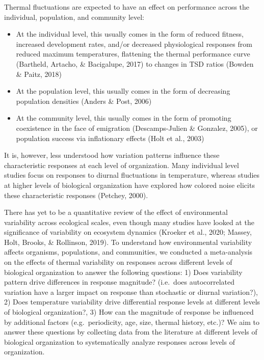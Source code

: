 \documentclass[12pt,twoside]{reedthesis}
\begin{document}
Thermal fluctuations are expected to have an effect on performance across the individual, population, and community level:
\begin{itemize}
\item
  At the individual level, this usually comes in the form of reduced fitness, increased development rates, and/or decreased physiological responses from reduced maximum temperatures, flattening the thermal performance curve (Bartheld, Artacho, \& Bacigalupe, 2017) to changes in TSD ratios (Bowden \& Paitz, 2018)
\item
  At the population level, this usually comes in the form of decreasing population densities (Anders \& Post, 2006)
\item
  At the community level, this usually comes in the form of promoting coexistence in the face of emigration (Descamps-Julien \& Gonzalez, 2005), or population success via inflationary effects (Holt et al., 2003)
\end{itemize}
It is, however, less understood how variation patterns influence these characteristic responses at each level of organization. Many individual level studies focus on responses to diurnal fluctuations in temperature, whereas studies at higher levels of biological organization have explored how colored noise elicits these characteristic responses (Petchey, 2000).

There has yet to be a quantitative review of the effect of environmental variability across ecological scales, even though many studies have looked at the significance of variability on ecosystem dynamics (Kroeker et al., 2020; Massey, Holt, Brooks, \& Rollinson, 2019). To understand how environmental variability affects organisms, populations, and communities, we conducted a meta-analysis on the effects of thermal variability on responses across different levels of biological organization to answer the following questions: 1) Does variability pattern drive differences in response magnitude? (i.e.~does autocorrelated variation have a larger impact on response than stochastic or diurnal variation?), 2) Does temperature variability drive differential response levels at different levels of biological organization?, 3) How can the magnitude of response be influenced by additional factors (e.g.~periodicity, age, size, thermal history, etc.)? We aim to answer these questions by collecting data from the literature at different levels of biological organization to systematically analyze responses across levels of organization.
\end{document}
